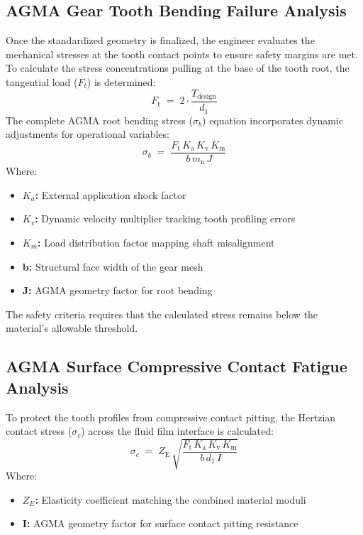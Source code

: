 	\subsection{AGMA Gear Tooth Bending Failure Analysis}
		Once the standardized geometry is finalized, the engineer evaluates the mechanical stresses at the tooth 
		contact points to ensure safety margins are met. To calculate the stress concentrations pulling at the 
		base of the tooth root, the tangential load ($F_{t}$) is determined: 
			\begin{equation}
				\label{eq:tangentialload}
				F_{\text{t}}
				\;=\;
				2 \cdot \frac{T_{\text{design}}}{d_{1}}
			\end{equation}
		The complete AGMA root bending stress ($\sigma_{b}$) equation incorporates dynamic adjustments for operational variables: 
			\begin{equation}
				\label{eq:agmarootbendingstress}
				\sigma_{b}
				\;=\;
				\frac{F_{\text{t}}\,K_{\text{a}}\,K_{\text{v}}\,K_{\text{m}}}
				{\,b\,m_{\text{n}}\,J}
			\end{equation}
		Where: 
			\begin{itemize}
				\item \textbf{$K_{a}$:} External application shock factor
				\item \textbf{$K_{v}$:} Dynamic velocity multiplier tracking tooth profiling errors
				\item \textbf{$K_{m}$:} Load distribution factor mapping shaft misalignment
				\item \textbf{b:} Structural face width of the gear mesh
				\item \textbf{J:} AGMA geometry factor for root bending
			\end{itemize}
		The safety criteria requires that the calculated stress remains below the material's allowable threshold. 

	\subsection{AGMA Surface Compressive Contact Fatigue Analysis}
		To protect the tooth profiles from compressive contact pitting, the Hertzian contact stress ($\sigma_{c}$)
		across the fluid film interface is calculated: 
			\begin{equation}
				\label{eq:hertziancontactstress}
				\sigma_{c}
				\;=\;
				Z_{\text{E}} 
				\,\sqrt{\frac{F_{\text{t}}\, K_{\text{a}}\, K_{\text{v}}\, K_{\text{m}}} {\,b\,d_{\text{1}}\,I}}
			\end{equation}
		Where: 
			\begin{itemize}
				\item \textbf{$Z_{E}$:} Elasticity coefficient matching the combined material moduli
				\item \textbf{I:} AGMA geometry factor for surface contact pitting resistance
			\end{itemize}

